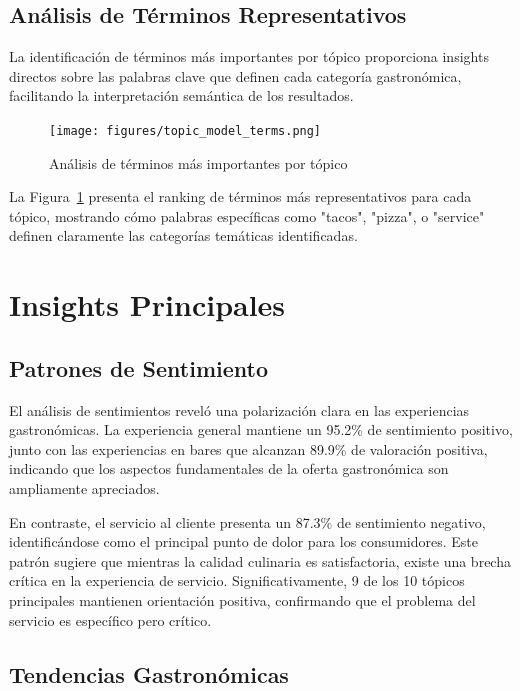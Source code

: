 \documentclass[12pt,a4paper,twoside,openany]{book}
\begin{document}
\subsection{Análisis de Términos Representativos}

La identificación de términos más importantes por tópico proporciona insights directos sobre las palabras clave que definen cada categoría gastronómica, facilitando la interpretación semántica de los resultados.

\begin{figure}[H]
\centering
\texttt{[image: figures/topic\_model\_terms.png]}
\caption{Análisis de términos más importantes por tópico}
\label{fig:topic_model_terms}
\end{figure}

La Figura~\ref{fig:topic_model_terms} presenta el ranking de términos más representativos para cada tópico, mostrando cómo palabras específicas como "tacos", "pizza", o "service" definen claramente las categorías temáticas identificadas.

\section{Insights Principales}

\subsection{Patrones de Sentimiento}

El análisis de sentimientos reveló una polarización clara en las experiencias gastronómicas. La experiencia general mantiene un 95.2\% de sentimiento positivo, junto con las experiencias en bares que alcanzan 89.9\% de valoración positiva, indicando que los aspectos fundamentales de la oferta gastronómica son ampliamente apreciados.

En contraste, el servicio al cliente presenta un 87.3\% de sentimiento negativo, identificándose como el principal punto de dolor para los consumidores. Este patrón sugiere que mientras la calidad culinaria es satisfactoria, existe una brecha crítica en la experiencia de servicio. Significativamente, 9 de los 10 tópicos principales mantienen orientación positiva, confirmando que el problema del servicio es específico pero crítico.

\subsection{Tendencias Gastronómicas}
\end{document}
